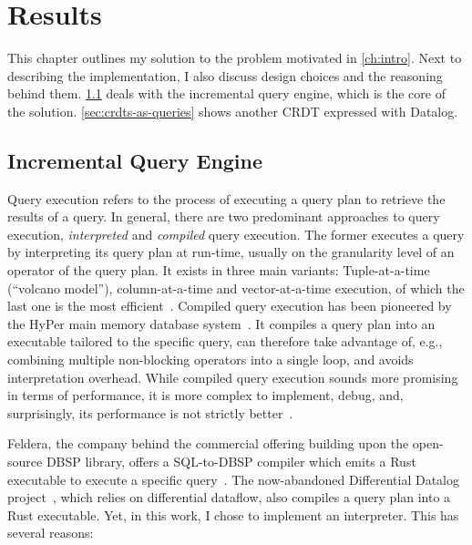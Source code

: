
\chapter{Results}\label{ch:results}

This chapter outlines my solution to the problem motivated in \ref{ch:intro}.
Next to describing the implementation, I also discuss design choices
and the reasoning behind them.
\ref{sec:incremental-query-engine} deals with the incremental query engine,
which is the core of the solution.
\ref{sec:crdts-as-queries} shows another \ac{CRDT} expressed with Datalog.

\section{Incremental Query Engine}\label{sec:incremental-query-engine}

Query execution refers to the process of executing a query plan to retrieve
the results of a query.
In general, there are two predominant approaches to query execution,
\emph{interpreted} and \emph{compiled} query execution.
The former executes a query by interpreting its query plan at run-time,
usually on the granularity level of an operator of the query plan.
It exists in three main variants: Tuple-at-a-time (``volcano model''),
column-at-a-time and vector-at-a-time execution,
of which the last one is the most efficient~\cite{zukowski2005monetdb}.
Compiled query execution has been pioneered by the HyPer main memory database
system~\cite{neumann2011efficiently}.
It compiles a query plan into an executable tailored to the specific query,
can therefore take advantage of, e.g., combining multiple non-blocking operators
into a single loop, and avoids interpretation overhead.
While compiled query execution sounds more promising in terms of performance,
it is more complex to implement, debug, and, surprisingly, its performance
is not strictly better~\cite{kersten2018everything}.

Feldera, the company behind the commercial offering building upon the
open-source DBSP library, offers a SQL-to-DBSP compiler which emits
a Rust executable to execute a specific query~\cite{feldera}.
The now-abandoned Differential Datalog project~\cite{ddlog}, which relies on
differential dataflow, also compiles a query plan into a Rust executable.
Yet, in this work, I chose to implement an interpreter. This has several reasons:

